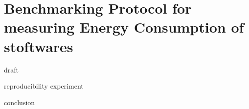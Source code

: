 \newpage
\label{chapter:benchmarking}
\chapter{Benchmarking Protocol for measuring Energy Consumption of stoftwares }

{draft}

{reproducibility}
{experiment}


{conclusion}




